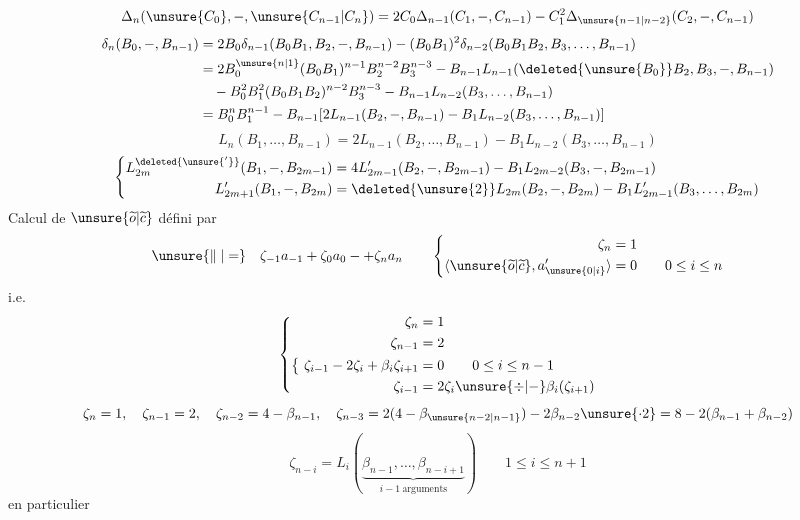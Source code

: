 \[
\Delta_n(\unsure{C_0},\mathbin{-},\unsure{C_{n-1}|C_n})
=2C_0\Delta_{n-1}(C_1,\mathbin{-},C_{n-1})
-C_1^2\Delta_{\unsure{n-1|n-2}}(C_2,\mathbin{-},C_{n-1})
\]
\[
\begin{aligned}
\delta_n(B_0,\mathbin{-},B_{n-1})
&=2B_0\delta_{n-1}(B_0B_1,B_2,\mathbin{-},B_{n-1})
-(B_0B_1)^2\delta_{n-2}(B_0B_1B_2,B_3,\ldots,B_{n-1})\\
&=2B_0^{\unsure{n|1}}(B_0B_1)^{n-1}B_2^{n-2}B_3^{n-3}
\mathbin{-}B_{n-1}L_{n-1}(\deleted{\unsure{B_0}}B_2,B_3,\mathbin{-},B_{n-1})\\
&\quad-B_0^2B_1^2(B_0B_1B_2)^{n-2}B_3^{n-3}
\mathbin{-}B_{n-1}L_{n-2}(B_3,\ldots,B_{n-1})\\
&=B_0^nB_1^{n-1}\mathbin{-}B_{n-1}
[2L_{n-1}(B_2,\mathbin{-},B_{n-1})-B_1L_{n-2}(B_3,\ldots,B_{n-1})]
\end{aligned}
\]
\[
\boxed{L_n(B_1,\ldots,B_{n-1})
=2L_{n-1}(B_2,\ldots,B_{n-1})-B_1L_{n-2}(B_3,\ldots,B_{n-1})}
\]
\[
\left\{\begin{aligned}
L_{2m}^{\deleted{\unsure{'}}}(B_1,\mathbin{-},B_{2m-1})
&=4L'_{2m-1}(B_2,\mathbin{-},B_{2m-1})
-B_1L_{2m-2}(B_3,\mathbin{-},B_{2m-1})\\
L'_{2m+1}(B_1,\mathbin{-},B_{2m})
&=\deleted{\unsure{2}}L_{2m}(B_2,\mathbin{-},B_{2m})
-B_1L'_{2m-1}(B_3,\ldots,B_{2m})
\end{aligned}\right.
\]
Calcul de $\unsure{\widetilde o|\widetilde c}$ défini par
\[
\unsure{\parallel|=}\quad\zeta_{-1}a_{-1}+\zeta_0a_0\mathbin{-}+\zeta_na_n
\qquad
\left\{\begin{aligned}
\zeta_n&=1\\
\langle\unsure{\widetilde o|\widetilde c},a'_{\unsure{0|i}}\rangle&=0
\qquad0\leq i\leq n
\end{aligned}\right.
\]
i.e.
\[
\left\{\begin{aligned}
\zeta_n&=1\\
\zeta_{n-1}&=2\\
\bigl\{\ \zeta_{i-1}-2\zeta_i+\beta_i\zeta_{i+1}&=0
\qquad0\leq i\leq n-1\\
\zeta_{i-1}&=2\zeta_i\unsure{\div|-}\beta_i(\zeta_{i+1})
\end{aligned}\right.
\]
\[
\zeta_n=1,\quad\zeta_{n-1}=2,\quad\zeta_{n-2}=4-\beta_{n-1},\quad
\zeta_{n-3}=2(4-\beta_{\unsure{n-2|n-1}})
-2\beta_{n-2}\unsure{\cdot2}
=8-2(\beta_{n-1}+\beta_{n-2})
\]
\[
\boxed{\zeta_{n-i}=L_i(\underbrace{\beta_{n-1},\ldots,\beta_{n-i+1}}_{i-1\ \text{arguments}})}
\qquad1\leq i\leq n+1
\]
en particulier
